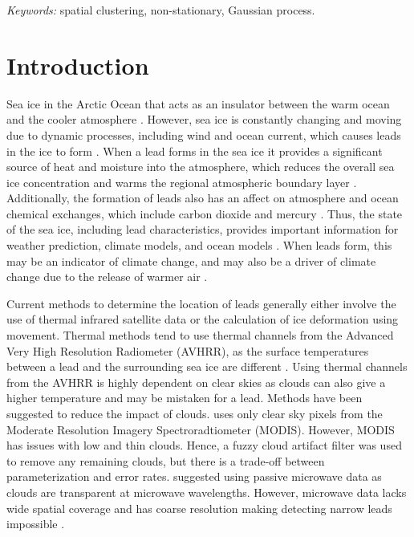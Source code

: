 \documentclass[12pt]{article}
\begin{document}
\noindent%
{\it Keywords:} spatial clustering, non-stationary, Gaussian process.
\vfill

\newpage
{} %

\hypertarget{introduction}{%
\section{Introduction}\label{introduction}}

Sea ice in the Arctic Ocean that acts as an insulator between the warm
ocean and the cooler atmosphere \citep{peterson_evaluating_2011}.
However, sea ice is constantly changing and moving due to dynamic
processes, including wind and ocean current, which causes leads in the
ice to form \citetext{\citealp{peterson_evaluating_2011}; \citealp[
]{hoffman_detection_2019}; \citealp{hutter_leads_2019}}. When a lead
forms in the sea ice it provides a significant source of heat and
moisture into the atmosphere, which reduces the overall sea ice
concentration and warms the regional atmospheric boundary layer
\citep[\citet{reiser_new_2020}]{key_detectability_1993}. Additionally,
the formation of leads also has an affect on atmosphere and ocean
chemical exchanges, which include carbon dioxide and mercury
\citep{hoffman_detection_2019}. Thus, the state of the sea ice,
including lead characteristics, provides important information for
weather prediction, climate models, and ocean models
\citep{reiser_new_2020}. When leads form, this may be an indicator of
climate change, and may also be a driver of climate change due to the
release of warmer air \citep{peterson_evaluating_2011}.

Current methods to determine the location of leads generally either
involve the use of thermal infrared satellite data or the calculation of
ice deformation using movement. Thermal methods tend to use thermal
channels from the Advanced Very High Resolution Radiometer (AVHRR), as
the surface temperatures between a lead and the surrounding sea ice are
different \citep{key_detectability_1993}. Using thermal channels from
the AVHRR is highly dependent on clear skies as clouds can also give a
higher temperature and may be mistaken for a lead. Methods have been
suggested to reduce the impact of clouds.
\citet{willmes_pan-arctic_2015} uses only clear sky pixels from the
Moderate Resolution Imagery Spectroradtiometer (MODIS). However, MODIS
has issues with low and thin clouds. Hence, a fuzzy cloud artifact
filter was used to remove any remaining clouds, but there is a trade-off
between parameterization and error rates. \citet{rohrs_algorithm_2012}
suggested using passive microwave data as clouds are transparent at
microwave wavelengths. However, microwave data lacks wide spatial
coverage and has coarse resolution making detecting narrow leads
impossible \citep{hoffman_detection_2019}.
\end{document}
